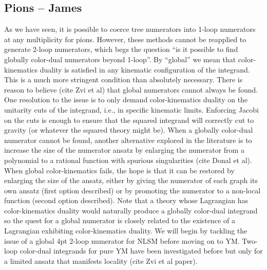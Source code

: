 \documentclass[11pt,letter]{article}
\begin{document}
\subsection{Pions -- James}

As we have seen, it is possible to coerce tree numerators into 1-loop numerators at any multiplicity for pions.
However, these methods cannot be reapplied to generate 2-loop numerators, which begs the question ``is it possible to find globally color-dual numerators beyond 1-loop''.
By ``global'' we mean that color-kinematics duality is satisfied in any kinematic configuration of the integrand.
This is a much more stringent condition than absolutely necessary.
There is reason to believe (cite Zvi et al) that global numerators cannot always be found.
One resolution to the issue is to only demand color-kinematics duality on the unitarity cuts of the integrand, i.e., in specific kinematic limits.
Enforcing Jacobi on the cuts is enough to ensure that the squared integrand will correctly cut to gravity (or whatever the squared theory might be).
When a globally color-dual numerator cannot be found, another alternative explored in the literature is to increase the size of the numerator ansatz by enlarging the numerator from a polynomial to a rational function with spurious singularities (cite Donal et al).
When global color-kinematics fails, the hope is that it can be restored by enlarging the size of the ansatz, either by giving the numerator of each graph its own ansatz (first option described) or by promoting the numerator to a non-local function (second option described).
Note that a theory whose Lagrangian has color-kinematics duality would naturally produce a globally color-dual integrand so the quest for a global numerator is closely related to the existence of a Lagrangian exhibiting color-kinematics duality.
We will begin by tackling the issue of a global 4pt 2-loop numerator for NLSM before moving on to YM.
Two-loop color-dual integrands for pure YM have been investigated before but only for a limited ansatz that manifests locality (cite Zvi et al paper).
\end{document}
